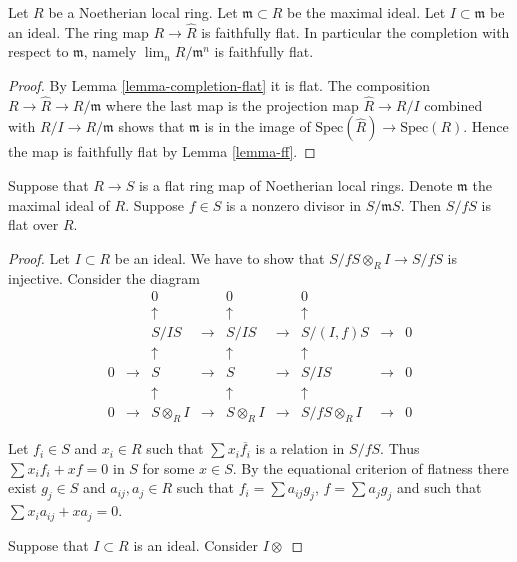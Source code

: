 \begin{lemma}
\label{lemma-flat}
Let $R$ be a Noetherian local ring.
Let $\mathfrak m \subset R$ be the maximal ideal.
Let $I \subset \mathfrak m$ be an ideal.
The ring map $R \to \hat R$ is faithfully flat.
In particular the completion with respect to $\mathfrak m$,
namely $\lim_n R/\mathfrak m^n$ is faithfully flat.
\end{lemma}

\begin{proof}
By Lemma \ref{lemma-completion-flat} it is flat.
The composition $R \to \hat R \to R/\mathfrak m$ where
the last map is the projection map $\hat R \to R/I$
combined with $R/I \to R/\mathfrak m$ shows that
$\mathfrak m$ is in the image of $\text{Spec}(\hat R)
\to \text{Spec}(R)$. Hence the map is faithfully
flat by Lemma \ref{lemma-ff}.
\end{proof}

\begin{lemma}
\label{lemma-grothendieck}
Suppose that $R \to S$ is a flat ring map of Noetherian
local rings. Denote $\mathfrak m$ the maximal ideal of $R$.
Suppose $f \in S$ is a nonzero divisor in $S/{\mathfrak m}S$.
Then $S/fS$ is flat over $R$.
\end{lemma}

\begin{proof}
Let $I \subset R$ be an ideal. We have to show that
$S/fS \otimes_R I \to S/fS$ is injective.
Consider the diagram
$$
\begin{matrix}
&
&
0
&
&
0
&
&
0
&
&
\\
&
&
\uparrow
&
&
\uparrow
&
&
\uparrow
&
&
\\
&
&
S/IS
&
\to
&
S/IS
&
\to
&
S/(I,f)S
&
\to
&
0
\\
&
&
\uparrow
&
&
\uparrow
&
&
\uparrow
&
&
\\
0
&
\to
&
S
&
\to
&
S
&
\to
&
S/IS
&
\to
&
0
\\
&
&
\uparrow
&
&
\uparrow
&
&
\uparrow
&
&
\\
0
&
\to
&
S \otimes_R I
&
\to
&
S \otimes_R I
&
\to
&
S/fS\otimes_R I
&
\to
&
0
\end{matrix}
$$











Let $f_i \in S$ and $x_i \in R$ such that $\sum x_i \overline{f_i}$
is a relation in $S/fS$. Thus $\sum x_i f_i + x f = 0$ in $S$ for some
$x\in S$. By the equational criterion of flatness there exist
$g_j \in S$ and $a_{ij}, a_j \in R$ such that
$f_i = \sum a_{ij} g_j$, $f = \sum a_j g_j$ and such that
$\sum x_i a_{ij} + xa_j = 0$. 

Suppose that $I \subset R$ is an ideal. 
Consider $I \otimes $

\end{proof}



